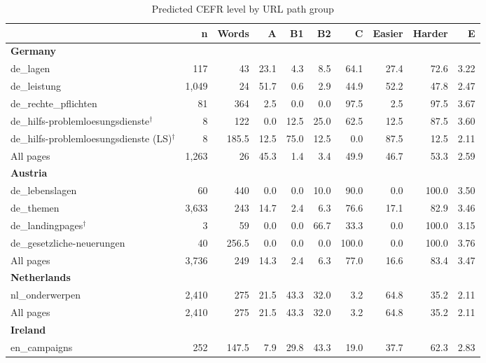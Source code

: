 \begin{table}[htbp]
\centering
\footnotesize\setlength{\tabcolsep}{4pt}
\begin{threeparttable}
\caption{Predicted CEFR level by URL path group}
\label{tab:cefr-by-path}
\begin{tabular}{lrrrrrrrrr}
\hline
 & n & Words & A & B1 & B2 & C & Easier & Harder & E \\
\hline
\textbf{Germany} &  &  &  &  &  &  &  &  &  \\
\quad de\_lagen & 117 & 43 & 23.1 & 4.3 & 8.5 & 64.1 & 27.4 & 72.6 & 3.22 \\
\quad de\_leistung & 1,049 & 24 & 51.7 & 0.6 & 2.9 & 44.9 & 52.2 & 47.8 & 2.47 \\
\quad de\_rechte\_pflichten & 81 & 364 & 2.5 & 0.0 & 0.0 & 97.5 & 2.5 & 97.5 & 3.67 \\
\quad de\_hilfs-problemloesungsdienste$^\dagger$ & 8 & 122 & 0.0 & 12.5 & 25.0 & 62.5 & 12.5 & 87.5 & 3.60 \\
\quad \quad de\_hilfs-problemloesungsdienste (LS)$^\dagger$ & 8 & 185.5 & 12.5 & 75.0 & 12.5 & 0.0 & 87.5 & 12.5 & 2.11 \\
\quad All pages & 1,263 & 26 & 45.3 & 1.4 & 3.4 & 49.9 & 46.7 & 53.3 & 2.59 \\
\hline
\textbf{Austria} &  &  &  &  &  &  &  &  &  \\
\quad de\_lebenslagen & 60 & 440 & 0.0 & 0.0 & 10.0 & 90.0 & 0.0 & 100.0 & 3.50 \\
\quad de\_themen & 3,633 & 243 & 14.7 & 2.4 & 6.3 & 76.6 & 17.1 & 82.9 & 3.46 \\
\quad de\_landingpages$^\dagger$ & 3 & 59 & 0.0 & 0.0 & 66.7 & 33.3 & 0.0 & 100.0 & 3.15 \\
\quad de\_gesetzliche-neuerungen & 40 & 256.5 & 0.0 & 0.0 & 0.0 & 100.0 & 0.0 & 100.0 & 3.76 \\
\quad All pages & 3,736 & 249 & 14.3 & 2.4 & 6.3 & 77.0 & 16.6 & 83.4 & 3.47 \\
\hline
\textbf{Netherlands} &  &  &  &  &  &  &  &  &  \\
\quad nl\_onderwerpen & 2,410 & 275 & 21.5 & 43.3 & 32.0 & 3.2 & 64.8 & 35.2 & 2.11 \\
\quad All pages & 2,410 & 275 & 21.5 & 43.3 & 32.0 & 3.2 & 64.8 & 35.2 & 2.11 \\
\hline
\textbf{Ireland} &  &  &  &  &  &  &  &  &  \\
\quad en\_campaigns & 252 & 147.5 & 7.9 & 29.8 & 43.3 & 19.0 & 37.7 & 62.3 & 2.83 \\

\end{tabular}
\end{threeparttable}
\end{table}
